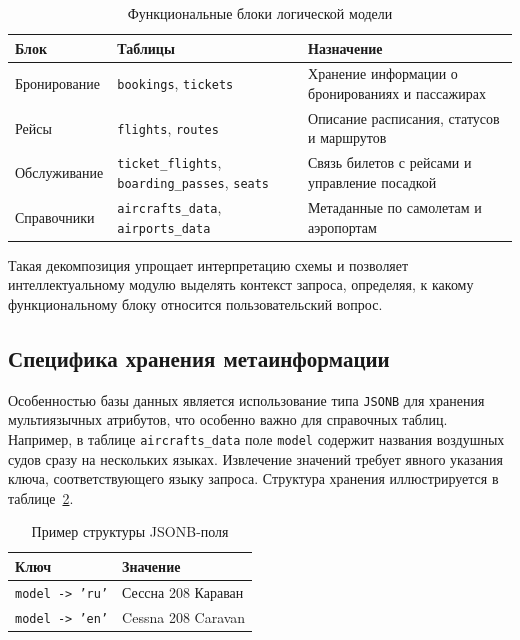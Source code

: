 \begin{table}[h!]
\centering
\caption{Функциональные блоки логической модели}
\label{tab:erd_blocks}
\small
\begin{tabularx}{\textwidth}{|>{\raggedright\arraybackslash}p{}|>{\raggedright\arraybackslash}p{}|>{\raggedright\arraybackslash}X|}
\hline
\textbf{Блок} & \textbf{Таблицы} & \textbf{Назначение} \\
\hline
Бронирование & \texttt{bookings}, \texttt{tickets} & Хранение информации о бронированиях и пассажирах \\
\hline
Рейсы & \texttt{flights}, \texttt{routes} & Описание расписания, статусов и маршрутов \\
\hline
Обслуживание & \texttt{ticket\_flights}, \texttt{boarding\_passes}, \texttt{seats} & Связь билетов с рейсами и управление посадкой \\
\hline
Справочники & \texttt{aircrafts\_data}, \texttt{airports\_data} & Метаданные по самолетам и аэропортам \\
\hline
\end{tabularx}
\end{table}

Такая декомпозиция упрощает интерпретацию схемы и позволяет интеллектуальному модулю выделять контекст запроса, определяя, к какому функциональному блоку относится пользовательский вопрос.

\subsection{Специфика хранения метаинформации}

Особенностью базы данных является использование типа \texttt{JSONB} для хранения мультиязычных атрибутов, что особенно важно для справочных таблиц. Например, в таблице \texttt{aircrafts\_data} поле \texttt{model} содержит названия воздушных судов сразу на нескольких языках. Извлечение значений требует явного указания ключа, соответствующего языку запроса. Структура хранения иллюстрируется в таблице~\ref{tab:json_example}.

\begin{table}[h!]
\centering
\caption{Пример структуры JSONB-поля}
\label{tab:json_example}
\begin{tabular}{|l|l|}
\hline
\textbf{Ключ} & \textbf{Значение} \\
\hline
\texttt{model -> 'ru'} & Сессна 208 Караван \\
\hline
\texttt{model -> 'en'} & Cessna 208 Caravan \\
\hline
\end{tabular}
\end{table}

